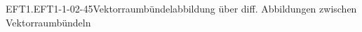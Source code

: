 \begin{DEF}{EFT1.EFT1-1-02-45}{Vektorraumbündelabbildung über diff. Abbildungen zwischen Vektorraumbündeln}

\end{DEF}
